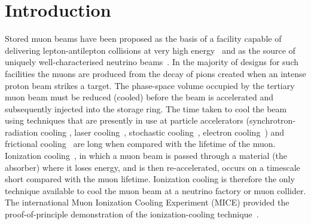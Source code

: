 \graphicspath{{01-Introduction/Figures/}}

\section{Introduction}
\label{Sect:Intro}

Stored muon beams have been proposed as the basis of a facility
capable of delivering lepton-antilepton collisions at very high
energy~\cite{Neuffer:1994bt,Palmer:2014nza} and as the source of
uniquely well-characterised neutrino 
beams~\cite{Geer:1998PhRvD..57.6989G,Bandyopadhyay:2007kx,Apollonio:2002en}.
In the majority of designs for such facilities the muons are produced
from the decay of pions created when an intense proton beam strikes a
target.
The phase-space volume occupied by the tertiary muon beam must be
reduced (cooled) before the beam is accelerated and subsequently injected
into the storage ring.
The time taken to cool the beam using techniques that are presently in
use at particle accelerators (synchrotron-radiation cooling
\cite{2012acph.book.....L}, laser
cooling~\cite{PhysRevLett.64.2901,PhysRevLett.67.1238,doi:10.1063/1.329218},
stochastic cooling~\cite{Marriner:2003mn}, electron
cooling~\cite{1063-7869-43-5-R01}) and frictional cooling~\cite{PhysRevLett.125.164802}
are long when compared with the lifetime of the muon.
Ionization cooling~\cite{cooling_methods,Neuffer:1983jr}, in which a
muon beam is passed through a material (the absorber) where it
loses energy, and is then re-accelerated, occurs on a timescale short
compared with the muon lifetime.
Ionization cooling is therefore the only technique available to cool the muon beam at a neutrino factory or muon collider.
The international Muon Ionization Cooling Experiment (MICE)
provided the proof-of-principle demonstration of the
ionization-cooling technique~\cite{Bogomilov:2019kfj}.

